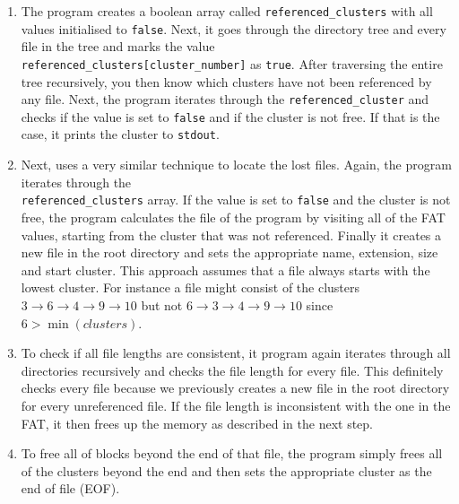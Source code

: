 \documentclass[10pt,a4paper]{article}
\begin{document}
\begin{enumerate}
  \item The program creates a boolean array called \texttt{referenced\_clusters} with all values initialised to \texttt{false}. Next, it goes through the directory tree and every file in the tree and marks the value\\\texttt{referenced\_clusters[cluster\_number]} as \texttt{true}.
  After traversing the entire tree recursively, you then know which clusters have not been referenced by any file. Next, the program iterates through the \texttt{referenced\_cluster} and checks if the value is set to \texttt{false} and if the cluster is not free.
  If that is the case, it prints the cluster to \texttt{stdout}.

  \item Next, uses a very similar technique to locate the lost files. Again, the program iterates through the \\\texttt{referenced\_clusters} array.
  If the value is set to \texttt{false} and the cluster is not free, the program calculates the file of the program by visiting all of the FAT values, starting from the cluster that was not referenced.
  Finally it creates a new file in the root directory and sets the appropriate name, extension, size and start cluster.
  This approach assumes that a file always starts with the lowest cluster. For instance a file might consist of the clusters $3 \rightarrow 6 \rightarrow 4 \rightarrow 9 \rightarrow 10$ but not $6 \rightarrow 3 \rightarrow 4 \rightarrow 9 \rightarrow 10$ since $6 > \min(clusters)$.

  \item To check if all file lengths are consistent, it program again iterates through all directories recursively and checks the file length for every file. This definitely checks every file because we previously creates a new file in the root directory for every unreferenced file.
  If the file length is inconsistent with the one in the FAT, it then frees up the memory as described in the next step.

  \item To free all of blocks beyond the end of that file, the program simply frees all of the clusters beyond the end and then sets the appropriate cluster as the end of file (EOF).
\end{enumerate}
\end{document}

